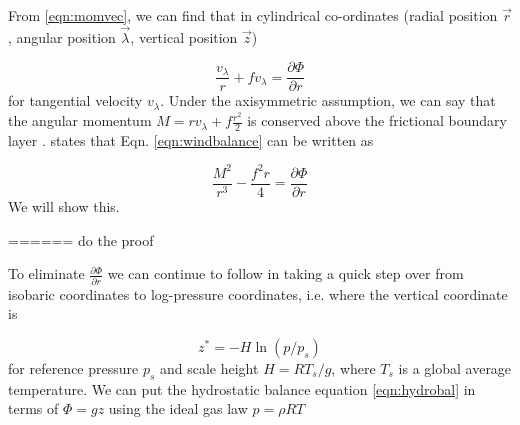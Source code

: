  





From \ref{eqn:momvec}, we can find that in cylindrical co-ordinates (radial position $\vec{r}$, angular position $\vec{\lambda}$, vertical position $\vec{z}$)

\begin{equation}
    \frac{v_{\lambda}}{r}+fv_{\lambda}=\frac{\partial \Phi}{\partial r}
    \label{eqn:windbalance}
\end{equation}
for tangential velocity $v_{\lambda}$. Under the axisymmetric assumption, we can say that the angular momentum $M=rv_{\lambda}+f\frac{r^2}{2}$ is conserved above the frictional boundary layer \cite{smith_montgomery_2017}. \cite{holton_hakim_2019} states that Eqn. \ref{eqn:windbalance} can be written as 

\begin{equation}
    \frac{M^2}{r^3}-\frac{f^2r}{4}=\frac{\partial\Phi}{\partial r}
    \label{eqn:windbalance_mom}
\end{equation}
We will show this. 

====== do the proof

To eliminate $\frac{\partial \Phi}{\partial r}$ we can continue to follow \cite{holton_hakim_2019} in taking a quick step over from isobaric coordinates to log-pressure coordinates, i.e. where the vertical coordinate is 

\begin{equation*}
    z^*=-H\ln(p/p_s)
\end{equation*}
for reference pressure $p_s$ and scale height $H=RT_s/g$, where $T_s$ is a global average temperature. We can put the hydrostatic balance equation \ref{eqn:hydrobal} in terms of $\Phi= gz$ using the ideal gas law $p=\rho RT$

